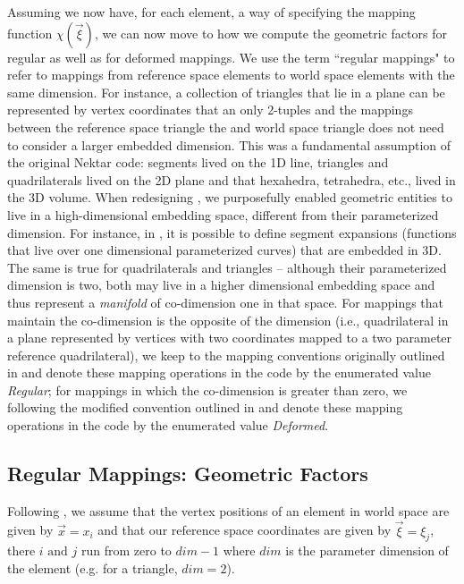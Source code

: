 Assuming we now have, for each element, a way of specifying the mapping function $\chi(\vec{\xi})$, we can now move to how we compute the geometric 
factors for regular as well as for deformed mappings. 
We use the term ``regular mappings" to refer to mappings from reference space elements to world space elements with the same dimension.  For instance, a 
collection of triangles that lie in a plane can be represented by vertex coordinates that an only 2-tuples and the mappings between the reference space
triangle the and world space triangle does not need to consider a larger embedded dimension.  This was a fundamental assumption of the original
Nektar code:  segments lived on the 1D line, triangles and quadrilaterals lived on the 2D plane and that hexahedra, tetrahedra, etc., lived in the 3D 
volume.   When redesigning {\nek}, we purposefully enabled geometric entities to live in a high-dimensional embedding space, different from their
parameterized dimension.  For instance, in {\nek}, it is possible to define segment expansions (functions that live over one dimensional parameterized
curves) that are embedded in 3D.  The same is true for quadrilaterals and triangles -- although their parameterized dimension is two, both may live in
a higher dimensional embedding space and thus represent a {\em manifold} of co-dimension one in that space.  For mappings that maintain the
co-dimension is the opposite of the dimension (i.e., quadrilateral in a plane represented by vertices with two coordinates mapped to a two parameter 
reference quadrilateral), we keep to the mapping conventions originally outlined in \cite{KaSh05} and denote these mapping operations in the code by the enumerated 
value {\em Regular}; for mappings in which the co-dimension is greater than zero, we following the modified convention outlined in \cite{CantwellYKPS14} and denote
these mapping operations in the code by the enumerated value {\em Deformed}.

\subsection{Regular Mappings: Geometric Factors}

Following \cite{KaSh05}, we assume that the vertex positions of an element in world space are given by $\vec{x} = x_i$ and that our reference space
coordinates are given by $\vec{\xi} = \xi_j$, there $i \text{ and } j$ run from zero to $dim-1$ where $dim$ is the parameter dimension of the element (e.g.
for a triangle, $dim = 2$).

